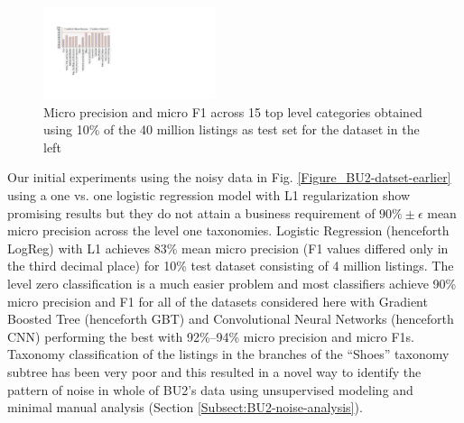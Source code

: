 \begin{figure}
	\centering
	\vspace{-0.6cm}
	\includegraphics[width=0.45\textwidth]{images/BU2-Dec2015-LogRegL1}
	\vspace{-0.6cm}
	\caption{{\small Micro precision and micro F1 across 15 top level categories obtained using 10\% of the 40 million listings as test set for the dataset in the left }}
	\label{Figure_BU2-WUC-LogRegL1}
	\vspace{-0.4cm}
\end{figure} 
Our initial experiments using the noisy data in Fig. \ref{Figure_BU2-datset-earlier} using a one vs. one logistic regression model with L1 regularization \cite{Yu13:EBay,LibShortText} show promising results but they do not attain a business requirement of $90\% \pm \epsilon$  mean micro precision across the level one taxonomies.
Logistic Regression (henceforth LogReg) with L1 achieves 83\% mean micro precision (F1 values differed only in the third decimal place) for 10\% test dataset consisting of 4 million listings.
The level zero classification is a much easier problem and most classifiers achieve 90\% micro precision and F1 for all of the datasets considered here with Gradient Boosted Tree (henceforth GBT) \cite{Friedman:GBT} and Convolutional Neural Networks (henceforth CNN) \cite{Kim14} performing the best with 92\%--94\% micro precision and micro F1s. 
Taxonomy classification of the listings in the branches of the ``Shoes'' taxonomy subtree has been very poor and this resulted in a novel way to identify the pattern of noise in whole of BU2's data using unsupervised modeling and minimal manual analysis (Section \ref{Subsect:BU2-noise-analysis}).

